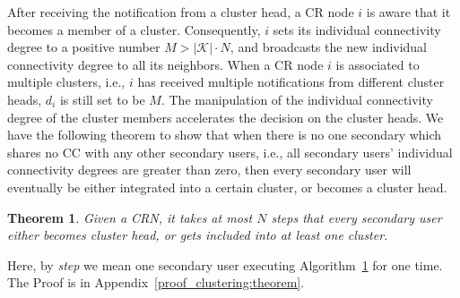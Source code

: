 \documentclass[10pt,journal,compsoc]{IEEEtran}
\makeatletter
\theoremstyle{mytheoremstyle}
\newtheorem{theorem}{Theorem}[section]
\theoremstyle{mytheoremstyle}
\theoremstyle{mytheoremstyle}
\renewenvironment{proof}[1][\proofname]{%
      \par\pushQED{\qed}\fontfamily{ptm}\selectfont%
      \topsep6\p@\@plus6\p@\relax
      \trivlist\item[\hskip\labelsep\bfseries#1\@addpunct{.}]%
      \ignorespaces
    }{%
      \popQED\endtrivlist\@endpefalse
    }
\newcommand{\ie}{i.e., }
\makeatother
\begin{document}
After receiving the notification from a cluster head, a CR node $i$ is aware that it becomes a member of a cluster. 
Consequently, $i$ sets its individual connectivity degree to a positive number $M > |\mathcal{K}| \cdot N$, and broadcasts the new individual connectivity degree to all its neighbors. 
When a CR node $i$ is associated to multiple clusters, \ie $i$ has received multiple notifications from different cluster heads, $d_i$ is still set to be $M$. 
The manipulation of the individual connectivity degree of the cluster members accelerates the decision on the cluster heads.
We have the following theorem to show that when there is no one secondary which shares no CC with any other secondary users, \ie
all secondary users' individual connectivity degrees are greater than zero, then every secondary user will eventually be either integrated into a certain cluster, or becomes a cluster head.
\begin{theorem}
\label{clustering:theorem}
Given a CRN, it takes at most $N$ steps that every secondary user either becomes cluster head, or gets included into at least one cluster.
\end{theorem}
Here, by \textit{step} we mean one secondary user executing Algorithm~\ref{clustering:theorem} for one time.
The Proof is in Appendix~\ref{proof_clustering:theorem}.
\end{document}
